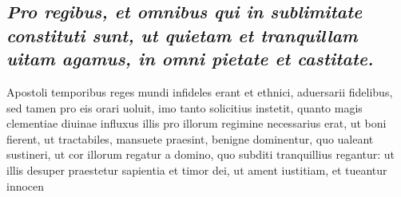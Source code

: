 \documentclass{article}
\begin{document}
\begin{pages}
{}
\subsection*{\textit{Pro regibus, et omnibus qui in sublimitate constituti sunt, ut quietam et tranquillam uitam agamus, in omni pietate et castitate. }}\pstart Apostoli temporibus reges mundi infideles erant et ethnici, aduersarii fidelibus, sed tamen pro eis orari uoluit, imo tanto solicitius instetit, quanto magis clementiae diuinae influxus illis pro illorum regimine necessarius erat, ut boni fierent, ut tractabiles, mansuete praesint, benigne dominentur, quo ualeant sustineri, ut cor illorum regatur a domino, quo subditi tranquillius regantur: ut illis desuper praestetur sapientia et timor dei, ut ament iustitiam, et tueantur innocen\pend

\end{pages}
\end{document}
